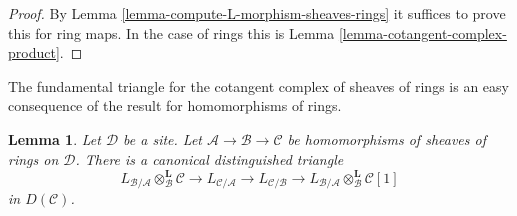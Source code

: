 \documentclass[10pt,a4paper]{article}
\theoremstyle{plain}
\newtheorem{lemma}[subsection]{Lemma}
\theoremstyle{definition}
\theoremstyle{remark}
\numberwithin{equation}{subsection}
\begin{document}
\begin{proof}
By Lemma \ref{lemma-compute-L-morphism-sheaves-rings}
it suffices to prove this for ring maps.
In the case of rings this is
Lemma \ref{lemma-cotangent-complex-product}.
\end{proof}

\noindent
The fundamental triangle for the cotangent complex of sheaves of rings
is an easy consequence of the result for homomorphisms of rings.

\begin{lemma}
\label{lemma-triangle-sheaves-rings}
Let $\mathcal{D}$ be a site. Let $\mathcal{A} \to \mathcal{B} \to \mathcal{C}$
be homomorphisms of sheaves of rings on $\mathcal{D}$.
There is a canonical distinguished triangle
$$
L_{\mathcal{B}/\mathcal{A}} \otimes_\mathcal{B}^\mathbf{L} \mathcal{C}
\to L_{\mathcal{C}/\mathcal{A}} \to L_{\mathcal{C}/\mathcal{B}} \to
L_{\mathcal{B}/\mathcal{A}} \otimes_\mathcal{B}^\mathbf{L} \mathcal{C}[1]
$$
in $D(\mathcal{C})$.
\end{lemma}
\end{document}
